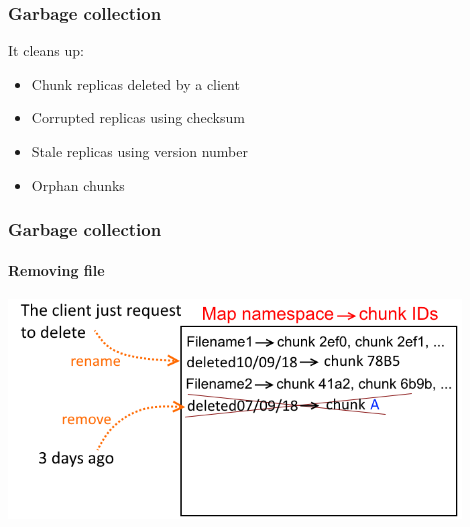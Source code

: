 \documentclass{beamer}
\newcommand{\slidewidth}{12cm}
\begin{document}
\begin{frame}
 \frametitle{Garbage collection}
 It cleans up:
 \begin{itemize}
  \item Chunk replicas deleted by a client
  \item Corrupted replicas using checksum
  \item Stale replicas using version number
  \item Orphan chunks
 \end{itemize}
\end{frame}

\begin{frame}
 \frametitle{Garbage collection}
 \framesubtitle{Removing file}
 \centering
 \includegraphics[width=\slidewidth]{figures/removeschema.png}
\end{frame}
\end{document}
